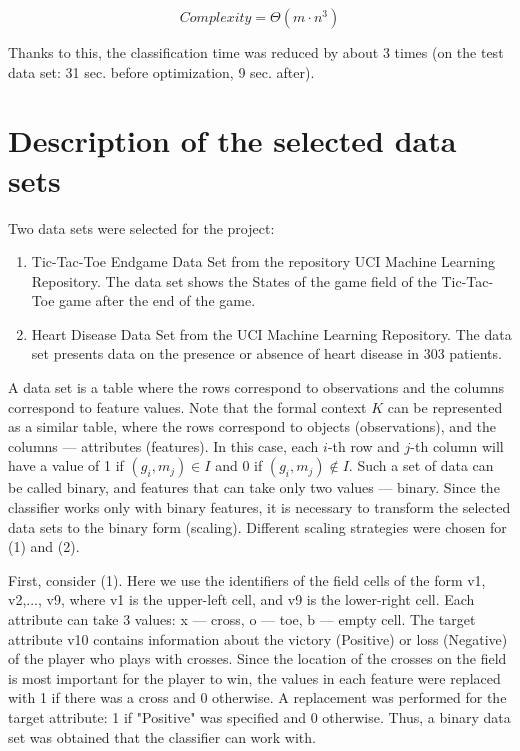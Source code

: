 \documentclass{article}
\begin{document}
$$Complexity = \Theta(m \cdot n^3)$$

Thanks to this, the classification time was reduced by about 3 times (on the test data set: 31 sec. before optimization, 9 sec. after).

\section{Description of the selected data sets}

Two data sets were selected for the project:
\begin{enumerate}
    \item Tic-Tac-Toe Endgame Data Set from the repository UCI Machine Learning Repository. The data set shows the States of the game field of the Tic-Tac-Toe game after the end of the game.
    \item Heart Disease Data Set from the UCI Machine Learning Repository. The data set presents data on the presence or absence of heart disease in 303 patients.
\end{enumerate}

A data set is a table where the rows correspond to observations and the columns correspond to feature values. Note that the formal context $K$ can be represented as a similar table, where the rows correspond to objects (observations), and the columns --- attributes (features). In this case, each $i$-th row and $j$-th column will have a value of 1 if $(g_i, m_j) \in I$ and 0 if $(g_i, m_j) \notin I$. Such a set of data can be called binary, and features that can take only two values --- binary. Since the classifier works only with binary features, it is necessary to transform the selected data sets to the binary form (scaling). Different scaling strategies were chosen for (1) and (2).

First, consider (1). Here we use the identifiers of the field cells of the form v1, v2,..., v9, where v1 is the upper-left cell, and v9 is the lower-right cell. Each attribute can take 3 values: x --- cross, o --- toe, b --- empty cell. The target attribute v10 contains information about the victory (Positive) or loss (Negative) of the player who plays with crosses. Since the location of the crosses on the field is most important for the player to win, the values in each feature were replaced with 1 if there was a cross and 0 otherwise. A replacement was performed for the target attribute: 1 if "Positive" was specified and 0 otherwise. Thus, a binary data set was obtained that the classifier can work with.
\end{document}
